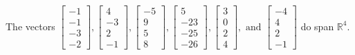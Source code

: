 \begin{exercise}
\begin{exerciseStatement}
  \end{exerciseStatement}
  \begin{exerciseAnswer}
   The vectors \(\left[\begin{array}{r}
-1 \\
-1 \\
-3 \\
-2
\end{array}\right] , \left[\begin{array}{r}
4 \\
-3 \\
2 \\
-1
\end{array}\right] , \left[\begin{array}{r}
-5 \\
9 \\
5 \\
8
\end{array}\right] , \left[\begin{array}{r}
5 \\
-23 \\
-25 \\
-26
\end{array}\right] , \left[\begin{array}{r}
3 \\
0 \\
2 \\
4
\end{array}\right] , \text{ and } \left[\begin{array}{r}
-4 \\
4 \\
2 \\
-1
\end{array}\right]\) 
  	 do  
	span \(\mathbb{R}^4\).
  


  \end{exerciseAnswer}
\end{exercise}
